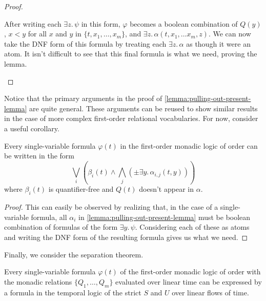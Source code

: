 \documentclass[a4paper,UKenglish,cleveref, autoref, thm-restate, numberwithinsect]{lipics-v2021}
\begin{document}
\begin{proof}
\begin{description}
        After writing each $\exists z.\, \psi$ in this form, $\varphi$ becomes a boolean combination of $Q(y)$, $x < y$ for all $x$ and $y$ in $\{t, x_1, \ldots, x_m\}$, and $\exists z.\, \alpha(t, x_1, \ldots x_m, z)$. We can now take the DNF form of this formula by treating each $\exists z.\, \alpha$ as though it were an atom. It isn't difficult to see that this final formula is what we need, proving the lemma.
    \end{description}
\end{proof}
Notice that the primary arguments in the proof of \cref{lemma:pulling-out-present-lemma} are quite general. These arguments can be reused to show similar results in the case of more complex first-order relational vocabularies. For now, consider a useful corollary.
\begin{corollary}
    \label{corollary:separate-present-form-fomlo}
    Every single-variable formula $\varphi(t)$ in the first-order monadic logic of order can be written in the form
    \begin{equation*}
        \bigvee_i \left( \beta_i(t) \land \bigwedge_j \left( \pm \exists y.\, \alpha_{i, j}\left(t, y\right) \right) \right)
    \end{equation*}
    where $\beta_i(t)$ is quantifier-free and $Q(t)$ doesn't appear in $\alpha$.
\end{corollary}
\begin{proof}
    This can easily be observed by realizing that, in the case of a single-variable formula, all $\alpha_i$ in \cref{lemma:pulling-out-present-lemma} must be boolean combination of formulas of the form $\exists y.\, \psi$. Considering each of these as atoms and writing the DNF form of the resulting formula gives us what we need.
\end{proof}
Finally, we consider the separation theorem.
\begin{theorem}
    \label{theorem:separation-theorem-linear-time}
    Every single-variable formula $\varphi(t)$ of the first-order monadic logic of order with the monadic relations $\{Q_1, \ldots, Q_m\}$ evaluated over linear time can be expressed by a formula in the temporal logic of the strict $S$ and $U$ over linear flows of time.
\end{theorem}
\end{document}
